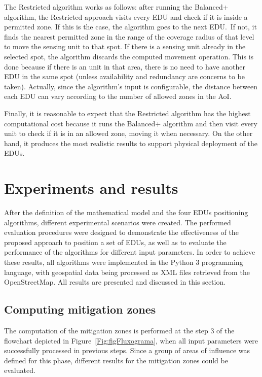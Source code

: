 \begin{refsection}
The Restricted algorithm works as follows: after running the Balanced+ algorithm, the Restricted approach visits every EDU and check if it is inside a permitted zone. If this is the case, the algorithm goes to the next EDU.\ If not, it finds the nearest permitted zone in the range of the coverage radius of that level to move the sensing unit to that spot. If there is a sensing unit already in the selected spot, the algorithm discards the computed movement operation. This is done because if there is an unit in that area, there is no need to have another EDU in the same spot (unless availability and redundancy are concerns to be taken). Actually, since the algorithm's input is configurable, the distance between each EDU can vary according to the number of allowed zones in the AoI. 

Finally, it is reasonable to expect that the Restricted algorithm has the highest computational cost because it runs the Balanced+ algorithm and then visit every unit to check if it is in an allowed zone, moving it when necessary. On the other hand, it produces the most realistic results to support physical deployment of the EDUs.

\section{Experiments and results}\label{S:5}

After the definition of the mathematical model and the four EDUs positioning algorithms, different experimental scenarios were created. The performed evaluation procedures were designed to demonstrate the effectiveness of the proposed approach to position a set of EDUs, as well as to evaluate the performance of the algorithms for different input parameters. In order to achieve these results, all algorithms were implemented in the Python 3 programming language, with geospatial data being processed as XML files retrieved from the OpenStreetMap. All results are presented and discussed in this section.

\subsection{Computing mitigation zones}

The computation of the mitigation zones is performed at the step 3 of the flowchart depicted in Figure~\ref{Fig:figFluxograma}, when all input parameters were successfully processed in previous steps. Since a group of areas of influence was defined for this phase, different results for the mitigation zones could be evaluated. 


\end{refsection}
